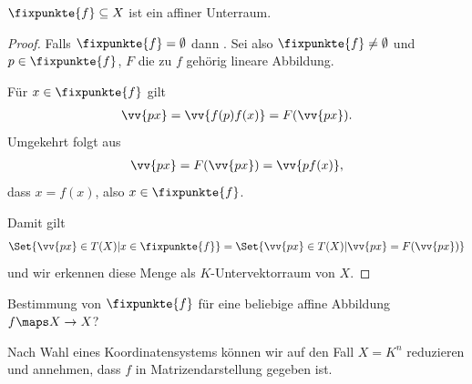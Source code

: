 \begin{lemma}\label{affine_fixpunkte_sind_affiner_unterraum}
    \( \fixpunkte{f}\subseteq X \) ist ein affiner Unterraum.
\end{lemma}
\begin{proof}
    Falls \( \fixpunkte{f}=\emptyset \) dann \checkmark. Sei also \( \fixpunkte{f}\neq \emptyset \) und \( p\in \fixpunkte{f} \), \( F \) die zu \( f \) gehörig lineare Abbildung.

    Für \( x\in \fixpunkte{f} \) gilt
    \begin{align*}
        \vv{px}=\vv{f(p) f(x)}=F(\vv{px}).
    \end{align*}
    Umgekehrt folgt aus
    \begin{align*}
        \vv{px}=F(\vv{px})=\vv{p f(x)},
    \end{align*}
    dass \( x=f(x) \), also \( x\in \fixpunkte{f} \).

    Damit gilt
    \begin{align*}
        \Set{\vv{px}\in T(X)|x\in \fixpunkte{f}}=\Set{\vv{px}\in T(X)|\vv{px}=F(\vv{px})}
    \end{align*}
    und wir erkennen diese Menge als \( K \)-Untervektorraum von \( X \).
\end{proof}
\begin{frage*}
    Bestimmung von \( \fixpunkte{f} \) für eine beliebige affine Abbildung \( f\maps X\to X \)?
\end{frage*}
Nach Wahl eines Koordinatensystems können wir auf den Fall \( X=K^n \) reduzieren und annehmen, dass \( f \) in Matrizendarstellung gegeben ist.

